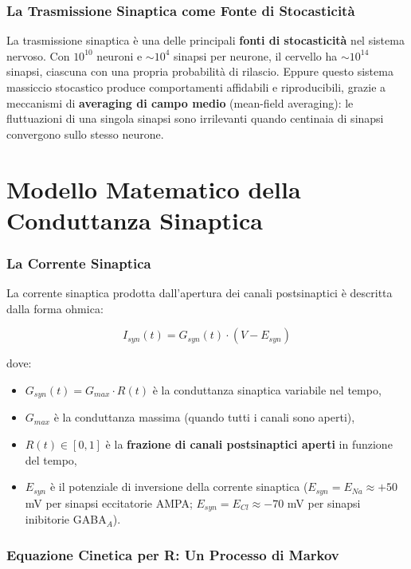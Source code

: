 \subsubsection{La Trasmissione Sinaptica come Fonte di Stocasticità}

La trasmissione sinaptica è una delle principali \textbf{fonti di stocasticità} nel sistema nervoso. Con $10^{10}$ neuroni e $\sim 10^4$ sinapsi per neurone, il cervello ha $\sim 10^{14}$ sinapsi, ciascuna con una propria probabilità di rilascio. Eppure questo sistema massiccio stocastico produce comportamenti affidabili e riproducibili, grazie a meccanismi di \textbf{averaging di campo medio} (mean-field averaging): le fluttuazioni di una singola sinapsi sono irrilevanti quando centinaia di sinapsi convergono sullo stesso neurone.


\section{Modello Matematico della Conduttanza Sinaptica}

\subsubsection{La Corrente Sinaptica}

La corrente sinaptica prodotta dall'apertura dei canali postsinaptici è descritta dalla forma ohmica:

\begin{equation}
I_{syn}(t) = G_{syn}(t) \cdot (V - E_{syn})
\end{equation}

dove:
\begin{itemize}
    \item $G_{syn}(t) = G_{max} \cdot R(t)$ è la conduttanza sinaptica variabile nel tempo,
    \item $G_{max}$ è la conduttanza massima (quando tutti i canali sono aperti),
    \item $R(t) \in [0, 1]$ è la \textbf{frazione di canali postsinaptici aperti} in funzione del tempo,
    \item $E_{syn}$ è il potenziale di inversione della corrente sinaptica ($E_{syn} = E_{Na} \approx +50$ mV per sinapsi eccitatorie AMPA; $E_{syn} = E_{Cl} \approx -70$ mV per sinapsi inibitorie GABA$_A$).
\end{itemize}

\subsubsection{Equazione Cinetica per R: Un Processo di Markov}

